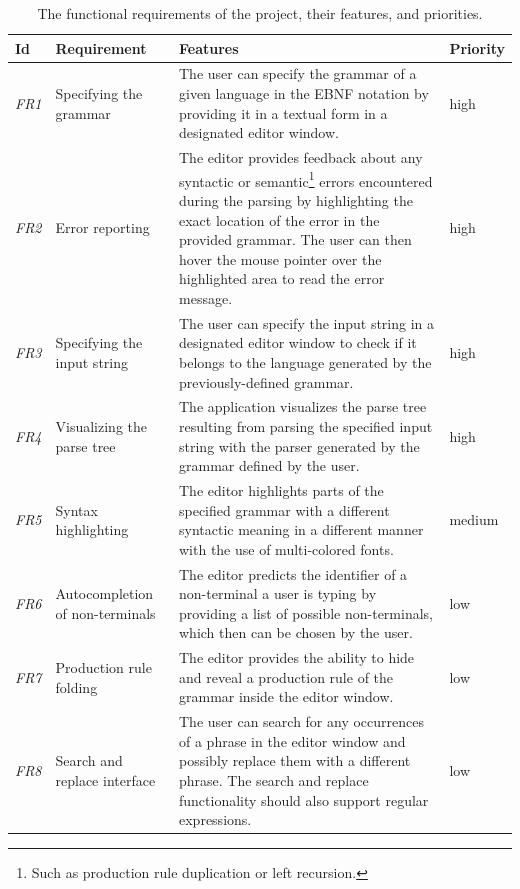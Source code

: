 \documentclass[english,bachelors,forcepolishlogotype]{wizthesis}
\begin{document}
\begin{xltabular}{\textwidth}{@{}lL{3cm}Xl@{}}
  \caption{The functional requirements of the project, their features, and
  priorities.}
  \label{tab:functional-requirements}\\
  \toprule
  Id & Requirement & Features & Priority \\* \midrule
  \endfirsthead
  \endhead
  \endfoot
  \endlastfoot
  \emph{FR1} & Specifying the grammar & The user can specify the grammar of a
  given language in the EBNF notation by providing it in a textual form in
  a designated editor window. & high \\
  \addlinespace[0.5em] \emph{FR2} & Error reporting & The editor provides
  feedback about any syntactic or semantic\footnote{Such as production
  rule duplication or left recursion.} errors encountered during the parsing by
  highlighting the exact location of the error in the provided grammar. The user
  can then hover the mouse pointer over the highlighted area to read the error
  message. & high \\
  \addlinespace[0.5em] \emph{FR3} & Specifying the input string & The user can
  specify the input string in a designated editor window to check if it
  belongs to the language generated by the previously-defined grammar. & high
  \\
  \addlinespace[0.5em] \emph{FR4} & Visualizing the parse tree & The
  application visualizes the parse tree resulting from parsing the specified
  input string with the parser generated by the grammar defined by the user. &
  high \\
  \addlinespace[0.5em] \emph{FR5} & Syntax highlighting & The editor highlights
  parts of the specified grammar with a different syntactic meaning in a
  different manner with the use of multi-colored fonts. & medium \\
  \addlinespace[0.5em] \emph{FR6} & Autocompletion of non-terminals & The
  editor predicts the identifier of a non-terminal a user is typing by
  providing a list of possible non-terminals, which then can be chosen by the
  user. & low \\
  \addlinespace[0.5em] \emph{FR7} & Production rule folding & The editor
  provides the ability to hide and reveal a production rule of the grammar
  inside the editor window. & low \\
  \addlinespace[0.5em] \emph{FR8} & Search and replace interface & The user can
  search for any occurrences of a phrase in the editor window and possibly
  replace them with a different phrase. The search and replace functionality
  should also support regular expressions. & low \\* \bottomrule
\end{xltabular}
\end{document}
